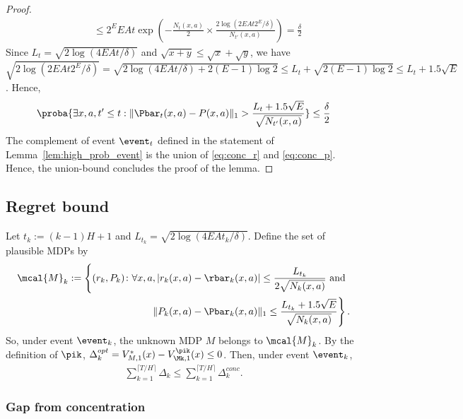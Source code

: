 \begin{proof}
\begin{align*}
                &\qquad \le 2^EEAt\exp\left(-\frac{N_t(x,a)}{2}\times\frac{2\log(2EAt2^E/\delta)}{N_{t'}(x,a)}\right) =\frac{\delta}2
                \end{align*}
                Since $L_t=\sqrt{2\log(4EAt/\delta)}$ and $\sqrt{x+y}\le\sqrt{x}+\sqrt{y}$, we have $\sqrt{2\log(2EAt2^E/\delta)}=\sqrt{2\log(4EAt/\delta) +2(E-1)\log2}\le L_t + \sqrt{2(E-1)\log2} \le L_t +1.5\sqrt{E}$.
                Hence,
                \begin{align}
                \label{eq:conc_p}
                \proba{\exists x,a, t'\le t: \Vert\Pbar_t(x,a)-P(x,a)\Vert_1 >\frac{L_t+1.5\sqrt{E}}{\sqrt{N_{t'}(x,a)}}} \le \frac{\delta}2
                \end{align}
                The complement of event $\event_t$ defined in the statement of Lemma~\ref{lem:high_prob_event} is the union of \eqref{eq:conc_r} and \eqref{eq:conc_p}.
                Hence, the union-bound concludes the proof of the lemma.
            \end{proof}
    
    \subsection{Regret bound}
    \label{subsec:regret_ucrl2}
    
        Let $t_k:=(k-1)H+1$ and $L_{t_k}=\sqrt{2\log(4EAt_k/\delta)}$.
        Define the set of plausible MDPs by
        \begin{align*}
            \mcal{M}_k :=\left\{(r_k,P_k) \colon \forall x,a, \vert r_k(x,a)-\rbar_k(x,a)\vert \le \frac{L_{t_k}}{2\sqrt{N_k(x,a)}} \text{ and }\right. \\
            \left. \Vert P_k(x,a)-\Pbar_k(x,a)\Vert_1\le \frac{L_{t_k}+1.5\sqrt{E}}{\sqrt{N_k(x,a)}}\right\}.
        \end{align*}
        So, under event $\event_k$, the unknown MDP $M$ belongs to $\mcal{M}_k$.
        By the definition of $\pik$, $\Delta_k^{opt}=V^*_{M,1}(x) -V^{\pik}_{\Mk,1}(x)\le0$.
        Then, under event $\event_k$,
        \begin{align*}
            \sum_{k=1}^{\lceil T/H\rceil}\Delta_k \le \sum_{k=1}^{\lceil T/H\rceil}\Delta_k^{conc}.
        \end{align*}
        
        \subsubsection{Gap from concentration}
        \label{subsubsec:sec_gap_conc}
        
